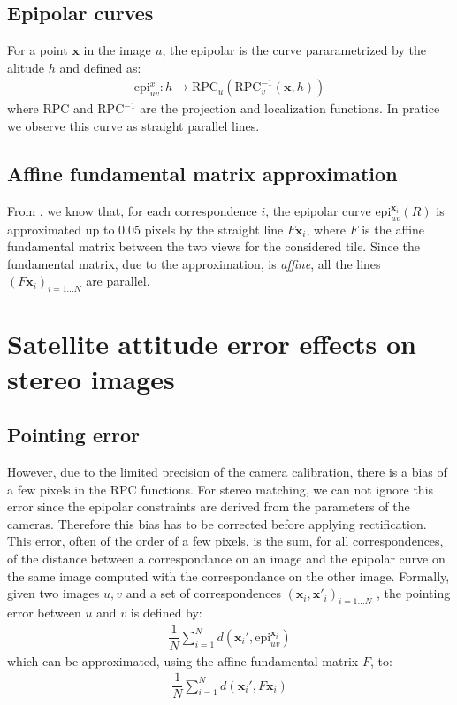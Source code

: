 \documentclass[paper=a4, fontsize=11pt, onecolumn, tikz, dvipsnames, svgnames, x11names]{article}
\begin{document}
\subsection{Epipolar curves}
For a point $\textbf{x}$ in the image $u$, the epipolar is the curve pararametrized by the alitude $h$ and defined as:
\begin{align*}
\text{epi}_{uv}^{x} : h \rightarrow \text{RPC}_u(\text{RPC}^{-1}_v(\textbf{x}, h))
\end{align*}
where RPC and RPC$^{-1}$ are the projection and localization functions. In pratice we observe this curve as straight parallel lines. 

\subsection{Affine fundamental matrix approximation}
From  \cite{de2014automatic}, we know that, for each correspondence $i$, the epipolar curve $\text{epi}^{\textbf{x}_i}_{u v}(R)$ is approximated up to $0.05$ pixels by the straight line $F\textbf{x}_i$, where $F$ is
the affine fundamental matrix between the two views for the considered tile. Since the fundamental matrix, due to the approximation, is \textit{affine}, all the lines $(F\textbf{x}_i)_{i=1...N}$ are parallel. 

\section{Satellite attitude error effects on stereo images}
\subsection{Pointing error}
However, due to the limited precision of the
camera calibration, there is a bias of a few pixels in the RPC functions. 
For stereo matching, we can not ignore this error since the epipolar constraints are derived from
the parameters of the cameras.
Therefore this bias has to be corrected before applying rectification.\\

This error, often of the order of a few pixels, is the sum, for all correspondences, of the distance between a correspondance on an image and the epipolar curve on the same image computed with the correspondance on the other image. 
Formally, given two images $u, v$ and a set of correspondences $(\textbf{x}_i, \textbf{x}'_i)_{i=1...N}$ , the pointing error between $u$ and $v$ is defined by:
\begin{align*}
\dfrac{1}{N} \sum\limits_{i=1}^{N} d(\textbf{x}_i', \text{epi}_{uv}^{\textbf{x}_i}) 
\end{align*}
which can be approximated, using the affine fundamental matrix $F$, to:
\begin{align*}
\dfrac{1}{N} \sum\limits_{i=1}^{N} d(\textbf{x}_i', F\textbf{x}_i) 
\end{align*}
\end{document}
